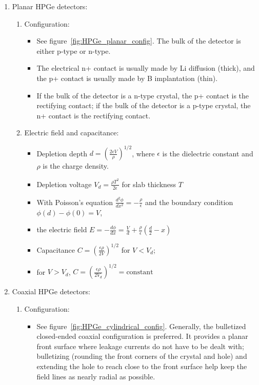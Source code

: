 \begin{enumerate}
    \item Planar HPGe detectors:
    \begin{enumerate}
        \item Configuration:
        \begin{itemize}
            \item See figure~\ref{fig:HPGe_planar_config}. The bulk of the detector is either p-type or n-type.
            \item The electrical n+ contact is usually made by Li diffusion (thick), and the p+ contact is usually made by B implantation (thin). 
            \item If the bulk of the detector is a n-type crystal, the p+ contact is the rectifying contact; if the bulk of the detector is a p-type crystal, the n+ contact is the rectifying contact. 
        \end{itemize}
        \item Electric field and capacitance:
        \begin{itemize}
            \item Depletion depth $d=\left(\frac{2\epsilon V}{\rho}\right)^{1/2}$, where $\epsilon$ is the dielectric constant and $\rho$ is the charge density.
            \item Depletion voltage $V_d=\frac{\rho T^2}{2\epsilon}$ for slab thickness $T$
            \item With Poisson's equation $\frac{d^2\phi}{dx^2}=-\frac{\rho}{\epsilon}$ and the boundary condition $\phi(d)-\phi(0)=V$,
            \item[] the electric field $E=-\frac{d\phi}{dx}=\frac{V}{d}+\frac{\rho}{\epsilon}\left(\frac{d}{2}-x\right)$
            \item Capacitance $C=\left(\frac{\epsilon\rho}{2V}\right)^{1/2}$ for $V<V_d$;
            \item[] for $V>V_d$, $C=\left(\frac{\epsilon\rho}{2V_d}\right)^{1/2}=\text{constant}$
        \end{itemize}
    \end{enumerate}
    \item Coaxial HPGe detectors:
    \begin{enumerate}
        \item Configuration:
        \begin{itemize}
            \item See figure~\ref{fig:HPGe_cylindrical_config}. Generally, the bulletized closed-ended coaxial configuration is preferred. It provides a planar front surface where leakage currents do not have to be dealt with; bulletizing (rounding the front corners of the crystal and hole) and extending the hole to reach close to the front surface help keep the field lines as nearly radial as possible. 

\end{itemize}
\end{enumerate}
\end{enumerate}
